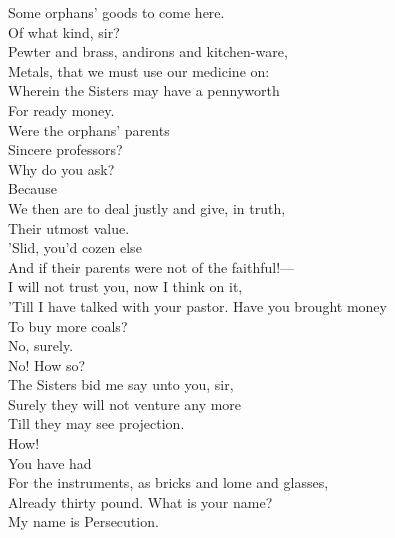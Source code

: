 \documentclass[a4paper,oneside,12pt]{memoir}
\begin{document}
\begin{drama*}
Some orphans' goods to come here.\\
\persecutionspeaks {} Of what kind, sir?\\
\subtlespeaks Pewter and brass, andirons and kitchen-ware,\\
Metals, that we must use our medicine on:\\
Wherein the Sisters may have a pennyworth\\
For ready money.\\
\persecutionspeaks {} Were the orphans' parents\\
Sincere professors?\\
\subtlespeaks {} Why do you ask?\\
\persecutionspeaks {} Because\\
We then are to deal justly and give, in truth,\\
Their utmost value.\\
\subtlespeaks {} 'Slid, you'd cozen else\\
And if their parents were not of the faithful!---\\
I will not trust you, now I think on it,\\
'Till I have talked with your pastor. Have you brought money\\
To buy more coals?\\
\persecutionspeaks {} No, surely.\\
\subtlespeaks {} No! How so?\\
\persecutionspeaks The Sisters bid me say unto you, sir,\\
Surely they will not venture any more\\
Till they may see projection.\\
\subtlespeaks {} How!\\
\persecutionspeaks {} You have had\\
For the instruments, as bricks and lome and glasses,\\
Already thirty pound.
\subtlespeaks {} What is your name?\\
\persecutionspeaks My name is Persecution.\\

\end{drama*}
\end{document}
